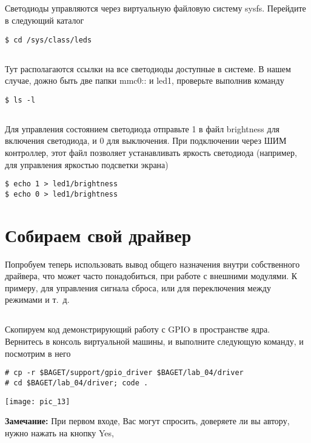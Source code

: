 \subsection{}Светодиоды управляются через виртуальную файловую систему sysfs. Перейдите в следующий каталог
\begin{lstlisting}[style=bash]
$ cd /sys/class/leds
\end{lstlisting}

\subsection{}Тут располагаются ссылки на все светодиоды доступные в системе. В нашем случае, дожно быть две папки mmc0:: и led1, проверьте выполнив команду  
\begin{lstlisting}[style=bash]
$ ls -l
\end{lstlisting}

\subsection{}Для управления состоянием светодиода отправьте 1 в файл brightness для включения светодиода, и 0 для выключения. При подключении через ШИМ контроллер, этот файл позволяет устанавливать яркость светодиода (например, для управления яркостью подсветки экрана)
\begin{lstlisting}[style=bash]
$ echo 1 > led1/brightness
$ echo 0 > led1/brightness
\end{lstlisting}

\section{Собираем свой драйвер}
Попробуем теперь использовать вывод общего назначения внутри собственного драйвера, что может часто понадобиться, при работе с внешними модулями. К примеру, для управления сигнала сброса, или для переключения между режимами и т. д.

\subsection{}Скопируем код демонстрирующий работу с GPIO в пространстве ядра. Вернитесь в консоль виртуальной машины, и выполните следующую команду, и посмотрим в него 
\begin{lstlisting}[style=bash]
# cp -r $BAGET/support/gpio_driver $BAGET/lab_04/driver
# cd $BAGET/lab_04/driver; code .
\end{lstlisting}
\begin{center}
	\texttt{[image: pic\_13]}
\end{center}
\textbf{Замечание:} При первом входе, Вас могут спросить, доверяете ли вы автору, нужно нажать на кнопку Yes,  


